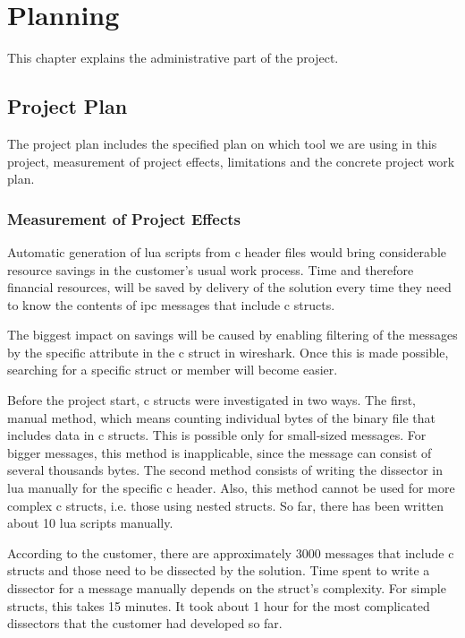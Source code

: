 \chapter{Planning}
This chapter explains the administrative part of the project.


\section{Project Plan}
The project plan includes the specified plan on which tool we are using in this project, measurement of project effects, limitations and the concrete project work plan.

\subsection{Measurement of Project Effects}
Automatic generation of \Gls{lua} \glspl{script} from \Gls{c} \gls{header} files would bring considerable resource savings in the customer's usual work process. Time and therefore financial resources, will be saved by delivery of the solution every time they need to know the contents of \gls{ipc} messages that include \Gls{c} \glspl{struct}.

The biggest impact on savings will be caused by enabling filtering of the messages by the specific attribute in the \Gls{c} \gls{struct} in \Gls{wireshark}. Once this is made possible, searching for a specific \gls{struct} or \gls{member} will become easier.

Before the project start, \Gls{c} \glspl{struct} were investigated in two ways. The first, manual method, which means counting individual bytes of the \gls{binary} file that includes data in \Gls{c} \glspl{struct}. This is possible only for small-sized messages. For bigger messages, this method is inapplicable, since the message can consist of several thousands bytes. The second method consists of writing the \gls{dissector} in \Gls{lua} manually for the specific \Gls{c} \gls{header}. Also, this method cannot be used for more complex \Gls{c} \glspl{struct}, i.e. those using \glspl{nested struct}. So far, there has been written about 10 \Gls{lua} \glspl{script} manually.

According to the customer, there are approximately 3000 messages that include \Gls{c} \glspl{struct} and those need to be dissected by the solution. Time spent to write a \gls{dissector} for a message manually depends on the \gls{struct}’s complexity. For simple \glspl{struct}, this takes 15 minutes. It took about 1 hour for the most complicated \glspl{dissector} that the customer had developed so far.

